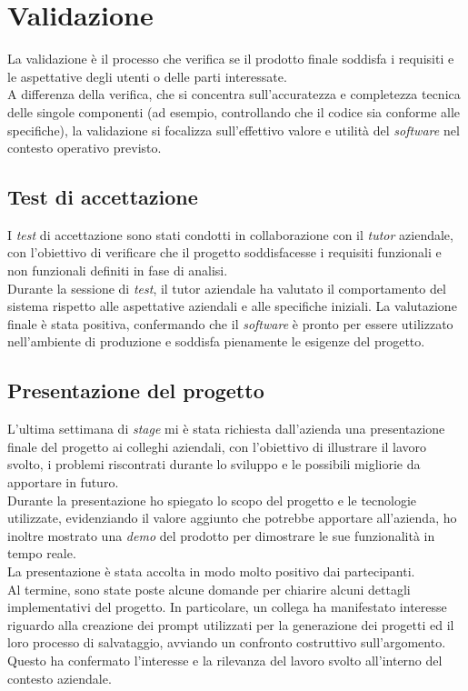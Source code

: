 \pagebreak
\section{Validazione}
\label{sez:validazione}

La validazione è il processo che verifica se il prodotto finale soddisfa i requisiti e le aspettative degli utenti o delle parti interessate. \\
A differenza della verifica, che si concentra sull’accuratezza e completezza tecnica delle singole componenti (ad esempio, controllando che il codice sia conforme alle specifiche), la validazione si focalizza sull’effettivo valore e utilità del \textit{software} nel contesto operativo previsto.  \\

\subsection{Test di accettazione}
\label{subsec:test-accettazione}

I \textit{test} di accettazione sono stati condotti in collaborazione con il \textit{tutor} aziendale, con l’obiettivo di verificare che il progetto soddisfacesse i requisiti funzionali e non funzionali definiti in fase di analisi.\\

\noindent Durante la sessione di \textit{test}, il tutor aziendale ha valutato il comportamento del sistema rispetto alle aspettative aziendali e alle specifiche iniziali. La valutazione finale è stata positiva, confermando che il \textit{software} è pronto per essere utilizzato nell’ambiente di produzione e soddisfa pienamente le esigenze del progetto.
\subsection{Presentazione del progetto}
\label{subsec:presentazione-progetto}

L'ultima settimana di \textit{stage} mi è stata richiesta dall'azienda una presentazione finale del progetto ai colleghi aziendali, con l'obiettivo di illustrare il lavoro svolto, i problemi riscontrati durante lo sviluppo e le possibili migliorie da apportare in futuro.\\

\noindent Durante la presentazione ho spiegato lo scopo del progetto e le tecnologie utilizzate, evidenziando il valore aggiunto che potrebbe apportare all'azienda, ho inoltre mostrato una \textit{demo} del prodotto per dimostrare le sue funzionalità in tempo reale.\\  

\noindent La presentazione è stata accolta in modo molto positivo dai partecipanti. \\Al termine, sono state poste alcune domande per chiarire alcuni dettagli implementativi del progetto. In particolare, un collega ha manifestato interesse riguardo alla creazione dei \gls{prompt} utilizzati per la generazione dei progetti ed il loro processo di salvataggio, avviando un confronto costruttivo sull’argomento.\\
Questo ha confermato l’interesse e la rilevanza del lavoro svolto all'interno del contesto aziendale.

